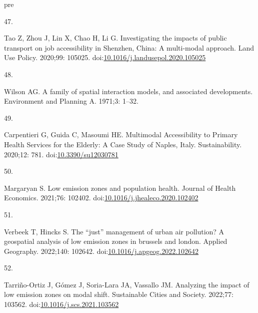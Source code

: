 \documentclass[10pt,letterpaper]{article}
\newlength{\cslhangindent}
\newlength{\csllabelwidth}
\newlength{\cslentryspacingunit} %
\newenvironment{CSLReferences}[2] %
 {%
  \setlength{\parindent}{0pt}
  \ifodd #1
  \let\oldpar\par
  \def\par{\hangindent=\cslhangindent\oldpar}
  \fi
  \setlength{\parskip}{#2\cslentryspacingunit}
 }%
 {}
\newcommand{\CSLLeftMargin}[1]{\parbox[t]{\csllabelwidth}{#1}}
\newcommand{\CSLRightInline}[1]{\parbox[t]{\linewidth - \csllabelwidth}{#1}\break}
\providecommand{\DIFaddtex}[1]{{\protect\color{blue}\uwave{#1}}} %
\providecommand{\DIFaddbegin}{} %
\providecommand{\DIFaddend}{} %
\providecommand{\DIFdelbegin}{} %
\providecommand{\DIFdelend}{} %
\providecommand{\DIFadd}[1]{\texorpdfstring{\DIFaddtex{#1}}{#1}} %
\newcommand{\DIFscaledelfig}{0.5}
\newlength{\DIFdelgraphicswidth} %
\newlength{\DIFdelgraphicsheight} %
\newcommand{\DIFaddincludegraphics}[2][]{{\color{blue}\fbox{\DIFOincludegraphics[#1]{#2}}}} %
\newcommand{\DIFdelincludegraphics}[2][]{%
\sbox{\DIFdelgraphicsbox}{\DIFOincludegraphics[#1]{#2}}%
\settoboxwidth{\DIFdelgraphicswidth}{\DIFdelgraphicsbox} %
\settoboxtotalheight{\DIFdelgraphicsheight}{\DIFdelgraphicsbox} %
\scalebox{\DIFscaledelfig}{%
\parbox[b]{\DIFdelgraphicswidth}{\usebox{\DIFdelgraphicsbox}\\[-\baselineskip] \rule{\DIFdelgraphicswidth}{0em}}\llap{\resizebox{\DIFdelgraphicswidth}{\DIFdelgraphicsheight}{%
\setlength{\unitlength}{\DIFdelgraphicswidth}%
\begin{picture}(1,1)%
\thicklines\linethickness{2pt} %
{\color[rgb]{1,0,0}\put(0,0){\framebox(1,1){}}}%
{\color[rgb]{1,0,0}\put(0,0){\line( 1,1){1}}}%
{\color[rgb]{1,0,0}\put(0,1){\line(1,-1){1}}}%
\end{picture}%
}\hspace*{3pt}}} %
} %
\DeclareRobustCommand{\DIFaddbegin}{\DIFOaddbegin \let\includegraphics\DIFaddincludegraphics} %
\DeclareRobustCommand{\DIFaddend}{\DIFOaddend \let\includegraphics\DIFOincludegraphics} %
\DeclareRobustCommand{\DIFdelbegin}{\DIFOdelbegin \let\includegraphics\DIFdelincludegraphics} %
\DeclareRobustCommand{\DIFdelend}{\DIFOaddend \let\includegraphics\DIFOincludegraphics} %
\begin{document}
\begin{CSLReferences}{0}{0}
\leavevmode\vadjust \DIFadd{pre}{\hypertarget{ref-taoInvestigatingImpactsPublic2020a}{}}%
\CSLLeftMargin{47. }%
\DIFaddend \CSLRightInline{Tao Z, Zhou J, Lin X, Chao H, Li G. Investigating the
impacts of public transport on job accessibility in {Shenzhen}, {China}:
A multi-modal approach. Land Use Policy. 2020;99: 105025.
doi:\href{https://doi.org/10.1016/j.landusepol.2020.105025}{10.1016/j.landusepol.2020.105025}}

\leavevmode{}%
\DIFdelbegin %
\DIFdelend \DIFaddbegin \CSLLeftMargin{48. }\DIFaddend %
\CSLRightInline{Wilson AG. A family of spatial interaction models, and
associated developments. Environment and Planning A. 1971;3: 1--32. }

\leavevmode{}%
\DIFdelbegin %
\DIFdelend \DIFaddbegin \CSLLeftMargin{49. }\DIFaddend %
\CSLRightInline{Carpentieri G, Guida C, Masoumi HE. Multimodal
{Accessibility} to {Primary Health Services} for the {Elderly}: {A Case
Study} of {Naples}, {Italy}. Sustainability. 2020;12: 781.
doi:\href{https://doi.org/10.3390/su12030781}{10.3390/su12030781}}

\leavevmode{}%
\DIFdelbegin %
\DIFdelend \DIFaddbegin \CSLLeftMargin{50. }\DIFaddend %
\CSLRightInline{Margaryan S. Low emission zones and population health.
Journal of Health Economics. 2021;76: 102402.
doi:\href{https://doi.org/10.1016/j.jhealeco.2020.102402}{10.1016/j.jhealeco.2020.102402}}

\leavevmode{}%
\DIFdelbegin %
\DIFdelend \DIFaddbegin \CSLLeftMargin{51. }\DIFaddend %
\CSLRightInline{Verbeek T, Hincks S. The {``just''} management of urban
air pollution? A geospatial analysis of low emission zones in brussels
and london. Applied Geography. 2022;140: 102642.
doi:\href{https://doi.org/10.1016/j.apgeog.2022.102642}{10.1016/j.apgeog.2022.102642}}

\leavevmode{}%
\DIFdelbegin %
\DIFdelend \DIFaddbegin \CSLLeftMargin{52. }\DIFaddend %
\CSLRightInline{Tarriño-Ortiz J, Gómez J, Soria-Lara JA, Vassallo JM.
Analyzing the impact of low emission zones on modal shift. Sustainable
Cities and Society. 2022;77: 103562.
doi:\href{https://doi.org/10.1016/j.scs.2021.103562}{10.1016/j.scs.2021.103562}}


\end{CSLReferences}
\end{document}
